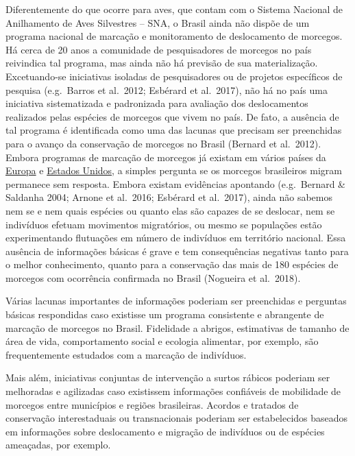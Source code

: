 \documentclass[
]{scrbook}
\begin{document}
Diferentemente do que ocorre para aves, que contam com o Sistema Nacional de Anilhamento de Aves Silvestres -- SNA, o Brasil ainda não dispõe de um programa nacional de marcação e monitoramento de deslocamento de morcegos. Há cerca de 20 anos a comunidade de pesquisadores de morcegos no país reivindica tal programa, mas ainda não há previsão de sua materialização. Excetuando-se iniciativas isoladas de pesquisadores ou de projetos específicos de pesquisa (e.g.~Barros et al.~2012; Esbérard et al.~2017), não há no país uma iniciativa sistematizada e padronizada para avaliação dos deslocamentos realizados pelas espécies de morcegos que vivem no país. De fato, a ausência de tal programa é identificada como uma das lacunas que precisam ser preenchidas para o avanço da conservação de morcegos no Brasil (Bernard et al.~2012). Embora programas de marcação de morcegos já existam em vários países da \href{http://www.eurobats.org}{Europa} e \href{https://www.usgs.gov/centers/cdi/science/north-american-bat-data-integration?qt-science_center_objects=0\#qt-science_center_objects}{Estados Unidos}, a simples pergunta se os morcegos brasileiros migram permanece sem resposta. Embora existam evidências apontando (e.g.~Bernard \& Saldanha 2004; Arnone et al.~2016; Esbérard et al.~2017), ainda não sabemos nem se e nem quais espécies ou quanto elas são capazes de se deslocar, nem se indivíduos efetuam movimentos migratórios, ou mesmo se populações estão experimentando flutuações em número de indivíduos em território nacional. Essa ausência de informações básicas é grave e tem consequências negativas tanto para o melhor conhecimento, quanto para a conservação das mais de 180 espécies de morcegos com ocorrência confirmada no Brasil (Nogueira et al.~2018).

Várias lacunas importantes de informações poderiam ser preenchidas e perguntas básicas respondidas caso existisse um programa consistente e abrangente de marcação de morcegos no Brasil. Fidelidade a abrigos, estimativas de tamanho de área de vida, comportamento social e ecologia alimentar, por exemplo, são frequentemente estudados com a marcação de indivíduos.

Mais além, iniciativas conjuntas de intervenção a surtos rábicos poderiam ser melhoradas e agilizadas caso existissem informações confiáveis de mobilidade de morcegos entre municípios e regiões brasileiras. Acordos e tratados de conservação interestaduais ou transnacionais poderiam ser estabelecidos baseados em informações sobre deslocamento e migração de indivíduos ou de espécies ameaçadas, por exemplo.
\end{document}
